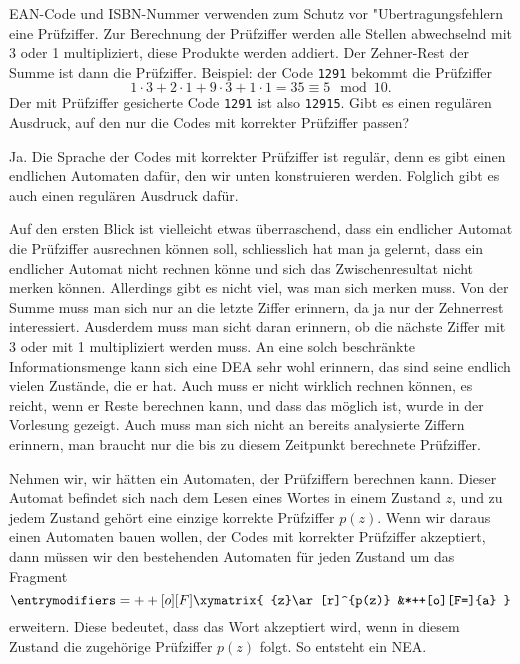 EAN-Code und ISBN-Nummer verwenden zum Schutz vor "Ubertragungsfehlern
eine Prüfziffer. Zur Berechnung der Prüfziffer werden alle
Stellen abwechselnd mit 3 oder 1 multipliziert, diese Produkte werden
addiert. Der Zehner-Rest der Summe ist dann die Prüfziffer.
Beispiel: der Code {\tt 1291} bekommt die Prüfziffer
\[
1\cdot 3+2\cdot1+9\cdot3+1\cdot 1=35\equiv 5\mod10.
\]
Der mit Prüfziffer gesicherte Code {\tt 1291} ist also {\tt 12915}.
Gibt es einen regulären Ausdruck, auf den nur die Codes mit korrekter
Prüfziffer passen?

\begin{loesung}
Ja. Die Sprache der Codes mit korrekter Prüfziffer ist regulär,
denn es gibt einen endlichen Automaten dafür, den wir unten konstruieren
werden. Folglich gibt es auch einen regulären Ausdruck dafür.

Auf den ersten Blick ist vielleicht etwas überraschend, dass
ein endlicher Automat die Prüfziffer ausrechnen können soll,
schliesslich hat man ja gelernt, dass ein endlicher Automat
nicht rechnen könne und sich das Zwischenresultat nicht merken
können. Allerdings gibt es nicht viel, was man sich merken
muss. Von der Summe muss man sich nur an die letzte Ziffer
erinnern, da ja nur der Zehnerrest interessiert. Ausderdem
muss man sicht daran erinnern, ob die nächste Ziffer mit
3 oder mit 1 multipliziert werden muss. An eine solch beschränkte
Informationsmenge kann sich eine DEA sehr wohl erinnern, das sind
seine endlich vielen Zustände, die er hat. Auch muss er nicht
wirklich rechnen können, es reicht, wenn er Reste berechnen
kann, und dass das möglich ist, wurde in der Vorlesung gezeigt.
Auch muss man sich nicht an bereits analysierte Ziffern erinnern,
man braucht nur die bis zu diesem Zeitpunkt berechnete Prüfziffer.

Nehmen wir, wir hätten ein Automaten, der Prüfziffern
berechnen kann. Dieser Automat befindet sich nach dem Lesen eines
Wortes in einem Zustand $z$, und zu jedem Zustand gehört eine
einzige korrekte Prüfziffer $p(z)$. Wenn wir daraus einen
Automaten bauen wollen, der Codes mit korrekter Prüfziffer
akzeptiert, dann müssen wir den bestehenden Automaten für
jeden Zustand um das Fragment
\[
\entrymodifiers={++[o][F]}
\xymatrix{
{z}\ar[r]^{p(z)}
        &*++[o][F=]{a}
}
\]
erweitern.
Diese bedeutet, dass das Wort akzeptiert wird, wenn in diesem
Zustand die zugehörige Prüfziffer $p(z)$ folgt. So entsteht
ein NEA.


\end{loesung}
